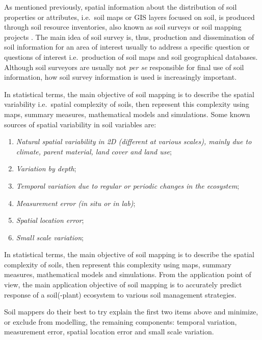 \documentclass[graybox,natbib,nospthms,UStrade]{svmono}
\let\BeginKnitrBlock\begin \let\EndKnitrBlock\end
\let\BeginKnitrBlock\begin \let\EndKnitrBlock\end
\begin{document}
As mentioned previously, spatial information about the distribution of
soil properties or attributes, i.e.~soil maps or GIS layers focused on
soil, is produced through soil resource inventories, also known as soil
surveys or soil mapping projects
\citep{Burrough1971, Avery1987, Wysocki2005Geoderma, Legros2006SP}. The
main idea of soil survey is, thus, production and dissemination of soil
information for an area of interest usually to address a specific
question or questions of interest i.e.~production of soil maps and soil
geographical databases. Although soil surveyors are usually not \emph{per se}
responsible for final use of soil information, how soil survey information
is used is increasingly important.

In statistical terms, the main objective of soil mapping is to describe
the spatial variability i.e.~spatial complexity of soils, then represent
this complexity using maps, summary measures, mathematical models and
simulations. Some known sources of spatial variability in soil variables
are:

\begin{enumerate}
\def\labelenumi{\arabic{enumi}.}
\item
  \emph{Natural spatial variability in 2D (different at various scales),
  mainly due to climate, parent material, land cover and land use};
\item
  \emph{Variation by depth};
\item
  \emph{Temporal variation due to regular or periodic changes in the
  ecosystem};
\item
  \emph{Measurement error (in situ or in lab)};
\item
  \emph{Spatial location error};
\item
  \emph{Small scale variation};
\end{enumerate}

\BeginKnitrBlock{rmdnote}
In statistical terms, the main objective of
soil mapping is to describe the spatial complexity of soils, then
represent this complexity using maps, summary measures, mathematical
models and simulations. From the application point of view, the main
application objective of soil mapping is to accurately predict response of a
soil(-plant) ecosystem to various soil management strategies.
\EndKnitrBlock{rmdnote}

Soil mappers do their best to try explain the first two items above and
minimize, or exclude from modelling, the remaining components: temporal
variation, measurement error, spatial location error and small scale
variation.
\end{document}
